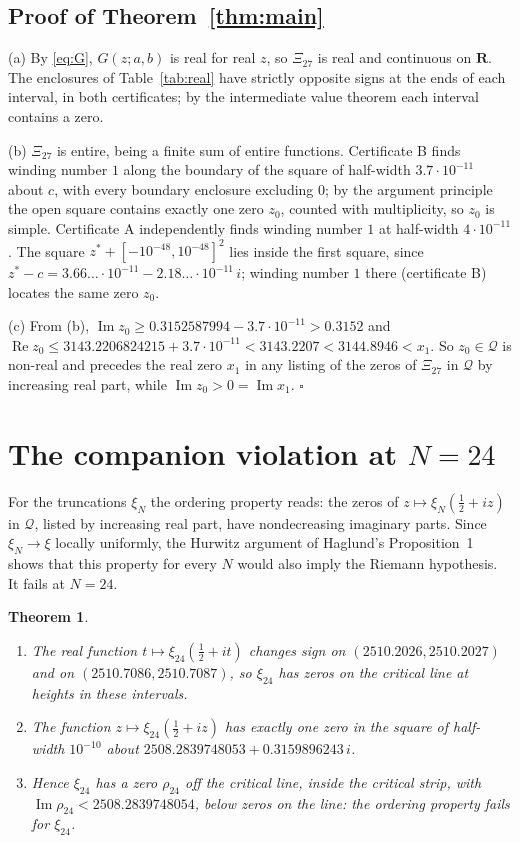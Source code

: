 \documentclass[11pt]{article}
\theoremstyle{plain}
\newtheorem{theorem}{Theorem}[section]
\theoremstyle{definition}
\theoremstyle{remark}
\newcommand{\R}{\mathbf{R}}
\newcommand{\Q}{\mathcal{Q}}
\newcommand{\re}{\operatorname{Re}}
\newcommand{\im}{\operatorname{Im}}
\begin{document}
\subsection{Proof of Theorem~\texorpdfstring{\ref{thm:main}}{1.1}}

(a) By \eqref{eq:G}, $G(z;a,b)$ is real for real $z$, so $\Xi_{27}$ is real and
continuous on $\R$. The enclosures of Table~\ref{tab:real} have strictly
opposite signs at the ends of each interval, in both certificates; by the
intermediate value theorem each interval contains a zero.

(b) $\Xi_{27}$ is entire, being a finite sum of entire functions. Certificate B
finds winding number $1$ along the boundary of the square of half-width
$3.7\cdot10^{-11}$ about $c$, with every boundary enclosure excluding $0$; by the
argument principle the open square contains exactly one zero $z_0$, counted
with multiplicity, so $z_0$ is simple. Certificate A independently finds winding
number $1$ at half-width $4\cdot10^{-11}$. The square
$z^* + [-10^{-48}, 10^{-48}]^2$ lies inside the first square, since
$z^* - c = 3.66\ldots\cdot10^{-11} - 2.18\ldots\cdot10^{-11}\,i$; winding number
$1$ there (certificate B) locates the same zero $z_0$.

(c) From (b), $\im z_0 \ge 0.3152587994 - 3.7\cdot10^{-11} > 0.3152$ and
$\re z_0 \le 3143.2206824215 + 3.7\cdot10^{-11} < 3143.2207 < 3144.8946 < x_1$.
So $z_0 \in \Q$ is non-real and precedes the real zero $x_1$ in any listing of
the zeros of $\Xi_{27}$ in $\Q$ by increasing real part, while
$\im z_0 > 0 = \im x_1$. \hfill$\square$

\section{The companion violation at \texorpdfstring{$N = 24$}{N = 24}}
\label{sec:xi24}

For the truncations $\xi_N$ the ordering property reads: the zeros of
$z \mapsto \xi_N(\tfrac12 + iz)$ in $\Q$, listed by increasing real part, have
nondecreasing imaginary parts. Since $\xi_N \to \xi$ locally uniformly, the
Hurwitz argument of Haglund's Proposition~1 shows that this property for every
$N$ would also imply the Riemann hypothesis. It fails at $N = 24$.

\begin{theorem}\label{thm:xi24}
\begin{enumerate}
\item[(a)] The real function $t \mapsto \xi_{24}(\tfrac12 + it)$ changes sign
on $(2510.2026, 2510.2027)$ and on $(2510.7086, 2510.7087)$, so $\xi_{24}$ has
zeros on the critical line at heights in these intervals.
\item[(b)] The function $z \mapsto \xi_{24}(\tfrac12 + iz)$ has exactly one zero
in the square of half-width $10^{-10}$ about
$2508.2839748053 + 0.3159896243\,i$.
\item[(c)] Hence $\xi_{24}$ has a zero $\rho_{24}$ off the critical line, inside
the critical strip, with $\im\rho_{24} < 2508.2839748054$, below zeros on the
line: the ordering property fails for $\xi_{24}$.
\end{enumerate}
\end{theorem}
\end{document}
